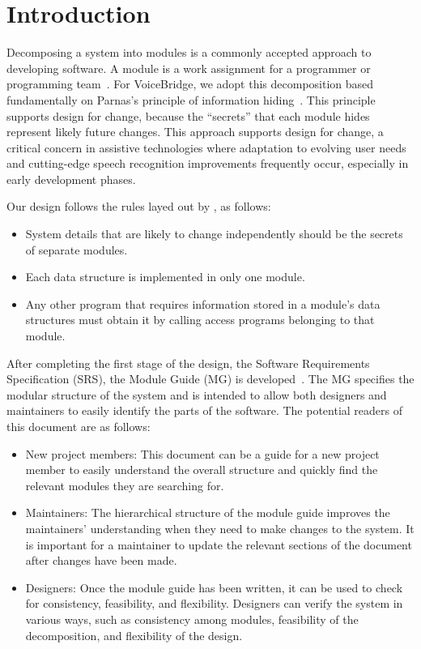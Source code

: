 \documentclass[12pt, titlepage]{article}
\begin{document}
\tableofcontents

\listoftables

\listoffigures

\newpage


\section{Introduction}

Decomposing a system into modules is a commonly accepted approach to developing
software.  A module is a work assignment for a programmer or programming
team~\citep{ParnasEtAl1984}.   For VoiceBridge, we adopt this decomposition based fundamentally on Parnas’s principle of information hiding~\citep{Parnas1972a}.  This
principle supports design for change, because the ``secrets'' that each module
hides represent likely future changes.  This approach supports design for change, a critical concern in assistive technologies where adaptation to evolving user needs and cutting-edge speech recognition improvements frequently occur, especially in early development phases.

Our design follows the rules layed out by \citet{ParnasEtAl1984}, as follows:
\begin{itemize}
\item System details that are likely to change independently should be the
  secrets of separate modules.
\item Each data structure is implemented in only one module.
\item Any other program that requires information stored in a module's data
  structures must obtain it by calling access programs belonging to that module.
\end{itemize}

After completing the first stage of the design, the Software Requirements
Specification (SRS), the Module Guide (MG) is developed~\citep{ParnasEtAl1984}. The MG
specifies the modular structure of the system and is intended to allow both
designers and maintainers to easily identify the parts of the software.  The
potential readers of this document are as follows:

\begin{itemize}
\item New project members: This document can be a guide for a new project member
  to easily understand the overall structure and quickly find the
  relevant modules they are searching for.
\item Maintainers: The hierarchical structure of the module guide improves the
  maintainers' understanding when they need to make changes to the system. It is
  important for a maintainer to update the relevant sections of the document
  after changes have been made.
\item Designers: Once the module guide has been written, it can be used to
  check for consistency, feasibility, and flexibility. Designers can verify the
  system in various ways, such as consistency among modules, feasibility of the
  decomposition, and flexibility of the design.
\end{itemize}
\end{document}

